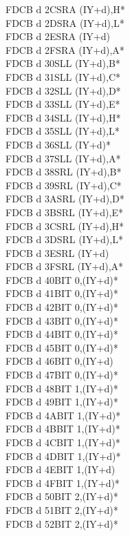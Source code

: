 \documentclass[oneside,a4paper]{book}
\begin{document}
\begin{multicols}{3}
{\begin{tabbing}
FDCB d 2C\>SRA (IY+d),H*\\
FDCB d 2D\>SRA (IY+d),L*\\
FDCB d 2E\>SRA (IY+d)\\
FDCB d 2F\>SRA (IY+d),A*\\
FDCB d 30\>SLL (IY+d),B*\\
FDCB d 31\>SLL (IY+d),C*\\
FDCB d 32\>SLL (IY+d),D*\\
FDCB d 33\>SLL (IY+d),E*\\
FDCB d 34\>SLL (IY+d),H*\\
FDCB d 35\>SLL (IY+d),L*\\
FDCB d 36\>SLL (IY+d)*\\
FDCB d 37\>SLL (IY+d),A*\\
FDCB d 38\>SRL (IY+d),B*\\
FDCB d 39\>SRL (IY+d),C*\\
FDCB d 3A\>SRL (IY+d),D*\\
FDCB d 3B\>SRL (IY+d),E*\\
FDCB d 3C\>SRL (IY+d),H*\\
FDCB d 3D\>SRL (IY+d),L*\\
FDCB d 3E\>SRL (IY+d)\\
FDCB d 3F\>SRL (IY+d),A*\\
FDCB d 40\>BIT 0,(IY+d)*\\
FDCB d 41\>BIT 0,(IY+d)*\\
FDCB d 42\>BIT 0,(IY+d)*\\
FDCB d 43\>BIT 0,(IY+d)*\\
FDCB d 44\>BIT 0,(IY+d)*\\
FDCB d 45\>BIT 0,(IY+d)*\\
FDCB d 46\>BIT 0,(IY+d)\\
FDCB d 47\>BIT 0,(IY+d)*\\
FDCB d 48\>BIT 1,(IY+d)*\\
FDCB d 49\>BIT 1,(IY+d)*\\
FDCB d 4A\>BIT 1,(IY+d)*\\
FDCB d 4B\>BIT 1,(IY+d)*\\
FDCB d 4C\>BIT 1,(IY+d)*\\
FDCB d 4D\>BIT 1,(IY+d)*\\
FDCB d 4E\>BIT 1,(IY+d)\\
FDCB d 4F\>BIT 1,(IY+d)*\\
FDCB d 50\>BIT 2,(IY+d)*\\
FDCB d 51\>BIT 2,(IY+d)*\\
FDCB d 52\>BIT 2,(IY+d)*\\

\end{tabbing}}
\end{multicols}
\end{document}
